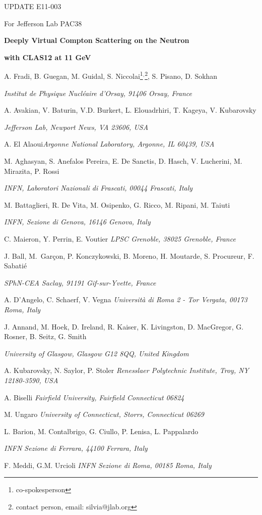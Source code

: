 \documentclass[12pt,oneside]{article}
\begin{document}
\begin{flushright}
\vspace{-1cm}
\centerline{UPDATE E11-003}
\centerline{For Jefferson Lab PAC38}

\end{flushright}

\vskip 0.5cm

{\Large{\centerline {\bf Deeply Virtual Compton Scattering on the Neutron}}}
{\Large{\centerline {\bf with CLAS12 at 11 GeV}}}

\vskip 0.5cm

\centerline{A. Fradi, B. Guegan, M. Guidal, S. Niccolai\footnote{co-spokesperson}$^,$\footnote{contact person, email: silvia@jlab.org}, S. Pisano, D. Sokhan}
\centerline{\it Institut de Physique Nucl\'eaire d'Orsay, 91406 Orsay, France}
\vskip 0.2cm
\centerline{A. Avakian, V. Baturin, V.D. Burkert, L. Elouadrhiri, T. Kageya, V. Kubarovsky\footnotemark[1]}
\centerline{\it Jefferson Lab, Newport News, VA 23606, USA}
\vskip 0.2cm
\centerline{A. El Alaoui\footnotemark[1] \it Argonne National Laboratory, Argonne, IL 60439, USA}
\vskip 0.2cm
\centerline{M. Aghasyan, S. Anefalos Pereira, E. De Sanctis, D. Hasch, V. Lucherini, M. Mirazita\footnotemark[1], P. Rossi}
\centerline{\it INFN, Laboratori Nazionali di Frascati, 00044 Frascati, Italy}
\vskip 0.2cm
\centerline{M. Battaglieri, R. De Vita, M. Osipenko, G. Ricco, M. Ripani, M. Taiuti}
\centerline{\it INFN, Sezione di Genova, 16146 Genova, Italy}
\vskip 0.2cm
\centerline{C. Maieron, Y. Perrin, E. Voutier \it LPSC Grenoble, 38025 Grenoble, France}
\vskip 0.2cm
\centerline{J. Ball, M.~Gar\c con, P. Konczykowski, B. Moreno, H. Moutarde, S. Procureur, F. Sabati\'e}
\centerline{\it SPhN-CEA Saclay, 91191 Gif-sur-Yvette, France}
\vskip 0.2cm
\centerline{A. D'Angelo, C. Schaerf, V. Vegna \it Universit\`a di Roma 2 - Tor Vergata, 00173 Roma, Italy}
\vskip 0.2cm
\centerline{J. Annand, M. Hoek, D. Ireland, R. Kaiser, K. Livingston, D. MacGregor, G. Rosner, B. Seitz, G. Smith}
\centerline{\it University of Glasgow, Glasgow G12 8QQ, United Kingdom}
\vskip 0.2cm
\centerline{A. Kubarovsky, N. Saylor, P. Stoler \it Renesslaer Polytechnic Institute, Troy, NY 12180-3590, USA}
\vskip 0.2cm
\centerline{A. Biselli \it Fairfield University, Fairfield Connecticut 06824}
\vskip 0.2cm
\centerline{M. Ungaro \it University of Connecticut, Storrs, Connecticut 06269}
\vskip 0.2cm
\centerline{L. Barion, M. Contalbrigo, G. Ciullo, P. Lenisa, L. Pappalardo}
\centerline{\it INFN Sezione di Ferrara, 44100 Ferrara, Italy}
\vskip 0.2cm
\centerline{F. Meddi, G.M. Urcioli \it INFN Sezione di Roma, 00185 Roma, Italy}
\end{document}
